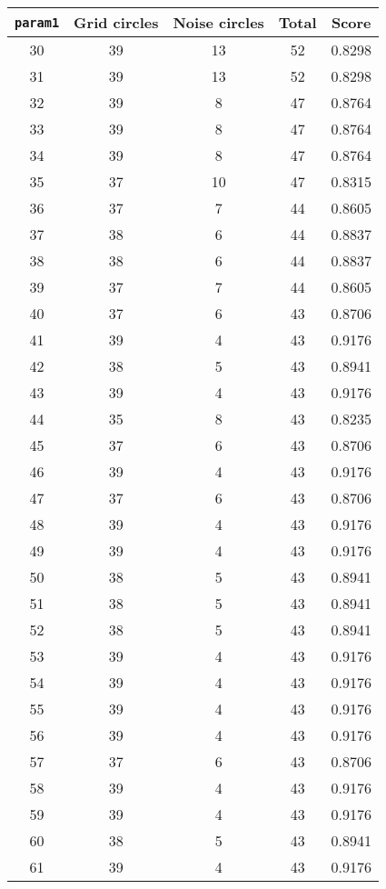 \documentclass[letterpaper, 12pt]{article}
\begin{document}
\begin{longtable}{|c|c|c|c|c|}
\hline
\textbf{\texttt{param1}} & \textbf{Grid circles} & \textbf{Noise circles} & \textbf{Total} & \textbf{Score} \\
\hline
30 & 39 & 13 & 52 & 0.8298 \\
\hline
31 & 39 & 13 & 52 & 0.8298 \\
\hline
32 & 39 & 8 & 47 & 0.8764 \\
\hline
33 & 39 & 8 & 47 & 0.8764 \\
\hline
34 & 39 & 8 & 47 & 0.8764 \\
\hline
35 & 37 & 10 & 47 & 0.8315 \\
\hline
36 & 37 & 7 & 44 & 0.8605 \\
\hline
37 & 38 & 6 & 44 & 0.8837 \\
\hline
38 & 38 & 6 & 44 & 0.8837 \\
\hline
39 & 37 & 7 & 44 & 0.8605 \\
\hline
40 & 37 & 6 & 43 & 0.8706 \\
\hline
41 & 39 & 4 & 43 & 0.9176 \\
\hline
42 & 38 & 5 & 43 & 0.8941 \\
\hline
43 & 39 & 4 & 43 & 0.9176 \\
\hline
44 & 35 & 8 & 43 & 0.8235 \\
\hline
45 & 37 & 6 & 43 & 0.8706 \\
\hline
46 & 39 & 4 & 43 & 0.9176 \\
\hline
47 & 37 & 6 & 43 & 0.8706 \\
\hline
48 & 39 & 4 & 43 & 0.9176 \\
\hline
49 & 39 & 4 & 43 & 0.9176 \\
\hline
50 & 38 & 5 & 43 & 0.8941 \\
\hline
51 & 38 & 5 & 43 & 0.8941 \\
\hline
52 & 38 & 5 & 43 & 0.8941 \\
\hline
53 & 39 & 4 & 43 & 0.9176 \\
\hline
54 & 39 & 4 & 43 & 0.9176 \\
\hline
55 & 39 & 4 & 43 & 0.9176 \\
\hline
56 & 39 & 4 & 43 & 0.9176 \\
\hline
57 & 37 & 6 & 43 & 0.8706 \\
\hline
58 & 39 & 4 & 43 & 0.9176 \\
\hline
59 & 39 & 4 & 43 & 0.9176 \\
\hline
60 & 38 & 5 & 43 & 0.8941 \\
\hline
61 & 39 & 4 & 43 & 0.9176 \\

\end{longtable}
\end{document}
